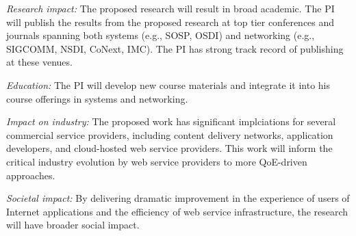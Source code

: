 \begin{packeditemize}
\item {\em Research impact:}
The proposed research will result in broad academic.
The PI will publish the results from the proposed research at top tier conferences and journals spanning both systems (e.g., SOSP, OSDI) and networking (e.g., SIGCOMM, NSDI, CoNext, IMC).
The PI has strong track record of publishing at these venues.

\item {\em Education:}
The PI will develop new course materials and integrate it into his course offerings in systems and networking. 

\item {\em Impact on industry:}
The proposed work has significant implciations for several commercial service providers, including content delivery networks, application developers, and cloud-hosted web service providers.
This work will inform the critical industry evolution by  web service providers to more QoE-driven approaches.

\item {\em Societal impact:}
By delivering dramatic improvement in the experience of users of Internet applications and the efficiency of web service infrastructure, the research will have broader social impact. 

\end{packeditemize}